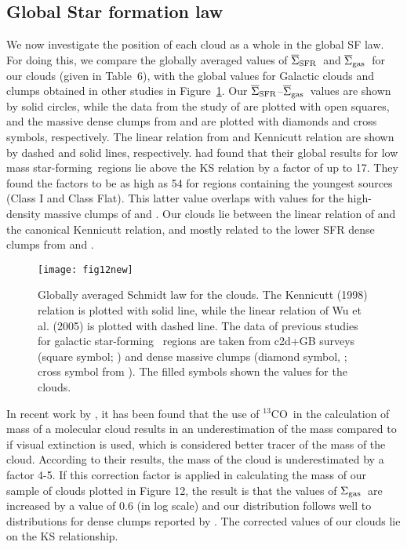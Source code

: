 \documentclass[iop]{emulateapj}
\newcommand{\starf}{star-forming}
\newcommand{\siggas}{$\Sigma_{\rm gas}$}
\newcommand{\sigsfrav}{$\overline\Sigma_{\rm SFR}$}
\newcommand{\siggasav}{$\overline\Sigma_{\rm gas}$}
\newcommand{\co}{$^{13}$CO}
\begin{document}
\subsection{Global Star formation law}


We now investigate the position of each cloud as a whole in the global SF law.
For doing this, we compare the globally averaged values of \sigsfrav\ and \siggasav\ 
for our clouds (given in Table~6), with the 
global values for Galactic clouds and clumps obtained in other studies
in Figure~\ref{figure12}. Our \sigsfrav--\siggasav\ 
values are shown by solid circles, while the data from the study of 
\citet{heiderman+10} are plotted with open squares, and  the massive dense 
clumps from \citet{wu+10} and \citet{heyer+16} are plotted with diamonds and cross 
symbols, respectively. 
The linear relation from \citet{wu+05} and Kennicutt relation \citep{kennicutt98} 
are shown by dashed and solid lines, respectively. \citet{heiderman+10} had found 
that their global results for low mass \starf~regions lie above the KS relation 
by a factor of up to 17. They found the factors to be as high as 54 for 
regions containing the youngest sources (Class I and Class Flat). This latter
value overlaps with values for the high-density massive clumps of \citet{wu+10} 
and \citet{heyer+16}.   
Our clouds lie between the linear relation of \citet{wu+05} and the canonical 
Kennicutt relation, and mostly related to the lower SFR dense clumps from 
\citet{heyer+16} and \citet{wu+10}.

\begin{figure}[!ht]
     \begin{center}
            \texttt{[image: fig12new]}
    \end{center}
\caption{
Globally averaged Schmidt law for the clouds. The Kennicutt (1998) relation 
is plotted with solid line, while the linear relation of Wu et al. (2005) is 
plotted with dashed line. The data of previous studies for galactic \starf~
regions are taken from c2d+GB surveys (square symbol; 
\cite{heiderman+10}) and dense massive clumps (diamond symbol, 
\cite{wu+10}; cross symbol from \cite{heyer+16}). The filled symbols shown 
the values for the clouds.
}
\label{figure12}
\end{figure}

In recent work by \citet{heiderman+10}, it has been found that the use of 
\co\ in the calculation of mass of a molecular cloud results in an underestimation 
of the mass compared to if visual extinction is used, which is considered better 
tracer of the mass of the cloud. According to their results, the mass of the 
cloud is underestimated by a factor 4-5. If this correction factor is applied in 
calculating the mass of our sample of clouds plotted in Figure 12, the result 
is that the values of \siggas\ are increased by a value of 0.6 (in log scale) 
and our distribution follows well to distributions for dense clumps reported by 
\citet{heyer+16,wu+10}. The corrected values of our clouds lie on the KS 
relationship.  
\end{document}
